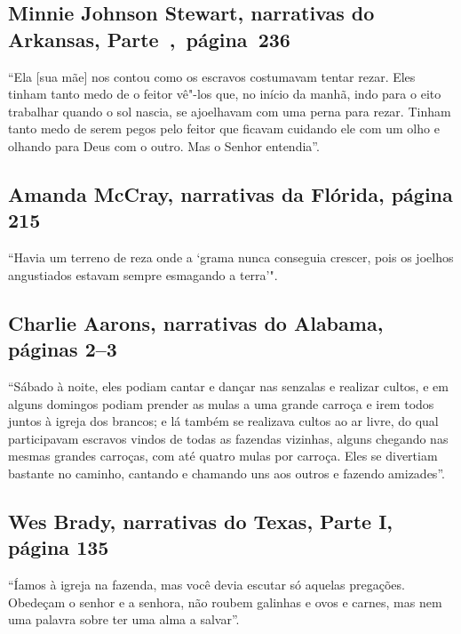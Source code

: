\subsection{Minnie Johnson Stewart, narrativas do Arkansas, Parte~,~página~236}
\label{ref253} 

``Ela {[}sua mãe{]} nos contou como os escravos costumavam tentar rezar.
Eles tinham tanto medo de o feitor vê"-los que, no início da manhã, indo
para o eito trabalhar quando o sol nascia, se ajoelhavam com uma perna
para rezar. Tinham tanto medo de serem pegos pelo feitor que ficavam
cuidando ele com um olho e olhando para Deus com o outro. Mas o Senhor
entendia''.

\subsection{Amanda McCray, narrativas da Flórida, página 215}
\label{ref185}

``Havia um terreno de reza onde a `grama nunca conseguia crescer, pois
os joelhos angustiados estavam sempre esmagando a terra'".

\subsection{Charlie Aarons, narrativas do Alabama, páginas 2--3} \label{ref02}

``Sábado à noite, eles podiam cantar e dançar nas senzalas e realizar
cultos, e em alguns domingos podiam prender as mulas a uma grande
carroça e irem todos juntos à igreja dos brancos; e lá também se
realizava cultos ao ar livre, do qual participavam escravos vindos de
todas as fazendas vizinhas, alguns chegando nas mesmas grandes carroças,
com até quatro mulas por carroça. Eles se divertiam bastante no caminho,
cantando e chamando uns aos outros e fazendo amizades''.

\subsection{Wes Brady, narrativas do Texas, Parte I, página 135} \label{ref32}

``Íamos à igreja na fazenda, mas você devia escutar só aquelas
pregações. Obedeçam o senhor e a senhora, não roubem galinhas e ovos e
carnes, mas nem uma palavra sobre ter uma alma a salvar''.

